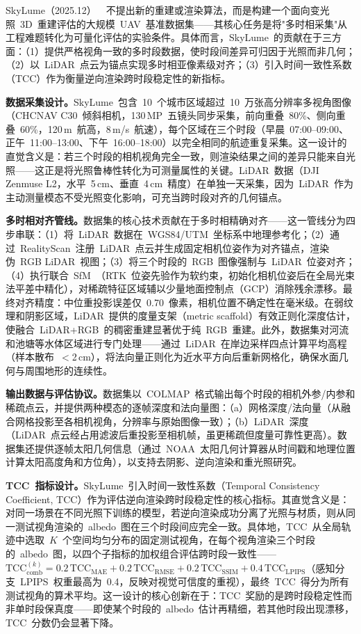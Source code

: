 SkyLume（2025.12）~\cite{2512_14200}~不提出新的重建或渲染算法，而是构建一个面向变光照~3D~重建评估的大规模~UAV~基准数据集——其核心任务是将"多时相采集"从工程难题转化为可量化评估的实验条件。具体而言，SkyLume~的贡献在于三方面：（1）提供严格视角一致的多时段数据，使时段间差异可归因于光照而非几何；（2）以~LiDAR~点云为锚点实现多时相亚像素级对齐；（3）引入时间一致性系数（TCC）作为衡量逆向渲染跨时段稳定性的新指标。

\textbf{数据采集设计。}SkyLume~包含~10~个城市区域超过~10~万张高分辨率多视角图像（CHCNAV C30~倾斜相机，130\,MP~五镜头同步采集，前向重叠~80\%、侧向重叠~60\%，120\,m~航高，8\,m/s~航速），每个区域在三个时段（早晨~07:00--09:00、正午~11:00--13:00、下午~16:00--18:00）以完全相同的航迹重复采集。这一设计的直觉含义是：若三个时段的相机视角完全一致，则渲染结果之间的差异只能来自光照——这正是将光照鲁棒性转化为可测量属性的关键。LiDAR~数据（DJI Zenmuse L2，水平~5\,cm、垂直~4\,cm~精度）在单独一天采集，因为~LiDAR~作为主动测量模态不受光照变化影响，可充当跨时段对齐的几何锚点。

\textbf{多时相对齐管线。}数据集的核心技术贡献在于多时相精确对齐——这一管线分为四步串联：（1）将~LiDAR~数据在~WGS84/UTM~坐标系中地理参考化；（2）通过~RealityScan~注册~LiDAR~点云并生成固定相机位姿作为对齐锚点，渲染伪~RGB LiDAR~视图；（3）将三个时段的~RGB~图像强制与~LiDAR~位姿对齐；（4）执行联合~SfM~（RTK~位姿先验作为软约束，初始化相机位姿后在全局光束法平差中精化），对稀疏特征区域辅以少量地面控制点（GCP）消除残余漂移。最终对齐精度：中位重投影误差仅~0.70~像素，相机位置不确定性在毫米级。在弱纹理和阴影区域，LiDAR~提供的度量支架（metric scaffold）有效正则化深度估计，使融合~LiDAR+RGB~的稠密重建显著优于纯~RGB~重建。此外，数据集对河流和池塘等水体区域进行专门处理——通过~LiDAR~在岸边采样四点计算平均高程（样本散布~$<$2\,cm），将法向量正则化为近水平方向后重新网格化，确保水面几何与周围地形的连续性。

\textbf{输出数据与评估协议。}数据集以~COLMAP~格式输出每个时段的相机外参/内参和稀疏点云，并提供两种模态的逐帧深度和法向量图：（a）网格深度/法向量（从融合网格投影至各相机视角，分辨率与原始图像一致）；（b）LiDAR~深度（LiDAR~点云经占用滤波后重投影至相机帧，虽更稀疏但度量可靠性更高）。数据集还提供逐帧太阳几何信息（通过~NOAA~太阳几何计算器从时间戳和地理位置计算太阳高度角和方位角），以支持去阴影、逆向渲染和重光照研究。

\textbf{TCC~指标设计。}SkyLume~引入时间一致性系数（Temporal Consistency Coefficient, TCC）作为评估逆向渲染跨时段稳定性的核心指标。其直觉含义是：对同一场景在不同光照下训练的模型，若逆向渲染成功分离了光照与材质，则从同一测试视角渲染的~albedo~图在三个时段间应完全一致。具体地，TCC~从全局轨迹中选取~$K$~个空间均匀分布的固定测试视角，在每个视角渲染三个时段的~albedo~图，以四个子指标的加权组合评估跨时段一致性——$\text{TCC}^{(k)}_\text{comb} = 0.2\,\text{TCC}_\text{MAE} + 0.2\,\text{TCC}_\text{RMSE} + 0.2\,\text{TCC}_\text{SSIM} + 0.4\,\text{TCC}_\text{LPIPS}$（感知分支~LPIPS~权重最高为~0.4，反映对视觉可信度的重视），最终~TCC~得分为所有测试视角的算术平均。这一设计的核心创新在于：TCC~奖励的是跨时段稳定性而非单时段保真度——即使某个时段的~albedo~估计再精细，若其他时段出现漂移，TCC~分数仍会显著下降。

